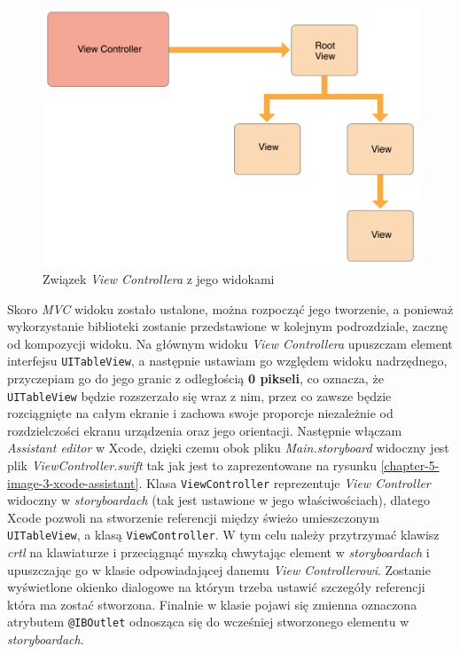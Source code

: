 \begin{figure}[ht!]
  \centering
  \includegraphics[width=120mm]{images/chapter-5-image-2-viewcontroller-relationship.png}
  \caption{Związek \textit{View Controllera} z jego widokami\cite{viewControllerProgrammingGuideforiOS}}
  \label{chapter-5-image-2-viewcontroller-relationship}
\end{figure}

Skoro \textit{MVC} widoku zostało ustalone, można rozpocząć jego tworzenie, a ponieważ wykorzystanie biblioteki zostanie przedstawione w kolejnym podrozdziale, zacznę od kompozycji widoku. Na głównym widoku \textit{View Controllera} upuszczam element interfejsu \texttt{UITableView}, a następnie ustawiam go względem widoku nadrzędnego, przyczepiam go do jego granic z odległością \textbf{0 pikseli}, co oznacza, że \texttt{UITableView} będzie rozszerzało się wraz z nim, przez co zawsze będzie rozciągnięte na całym ekranie i zachowa swoje proporcje niezależnie od rozdzielczości ekranu urządzenia oraz jego orientacji. Następnie włączam \textit{Assistant editor} w Xcode, dzięki czemu obok pliku \textit{Main.storyboard} widoczny jest plik \textit{ViewController.swift} tak jak jest to zaprezentowane na rysunku \ref{chapter-5-image-3-xcode-assistant}. Klasa \texttt{ViewController} reprezentuje \textit{View Controller} widoczny w \textit{storyboardach} (tak jest ustawione w jego właściwościach), dlatego Xcode pozwoli na stworzenie referencji między świeżo umieszczonym \texttt{UITableView}, a klasą \texttt{ViewController}. W tym celu należy przytrzymać klawisz \textit{crtl} na klawiaturze i przeciągnąć myszką chwytając element w \textit{storyboardach} i upuszczając go w klasie odpowiadającej danemu \textit{View Controllerowi}. Zostanie wyświetlone okienko dialogowe na którym trzeba ustawić szczegóły referencji która ma zostać stworzona. Finalnie w klasie pojawi się zmienna oznaczona atrybutem \texttt{@IBOutlet} odnosząca się do wcześniej stworzonego elementu w \textit{storyboardach}.

